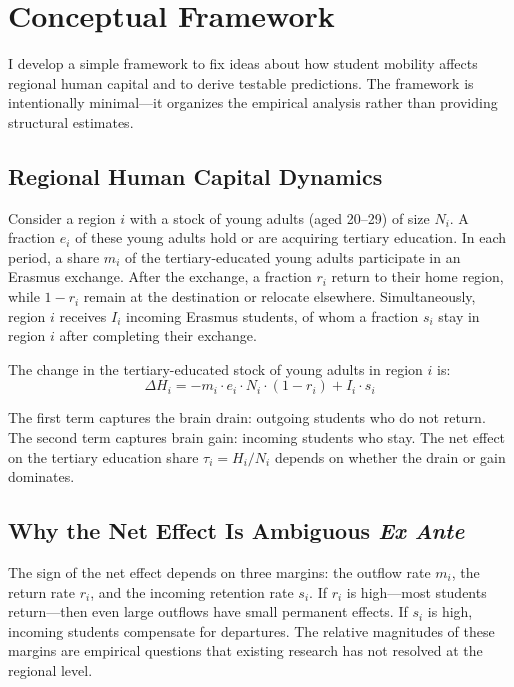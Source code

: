 \documentclass[12pt]{article}
\begin{document}
\section{Conceptual Framework}
\label{sec:framework}

I develop a simple framework to fix ideas about how student mobility affects regional human capital and to derive testable predictions. The framework is intentionally minimal---it organizes the empirical analysis rather than providing structural estimates.

\subsection{Regional Human Capital Dynamics}

Consider a region $i$ with a stock of young adults (aged 20--29) of size $N_i$. A fraction $e_i$ of these young adults hold or are acquiring tertiary education. In each period, a share $m_i$ of the tertiary-educated young adults participate in an Erasmus exchange. After the exchange, a fraction $r_i$ return to their home region, while $1 - r_i$ remain at the destination or relocate elsewhere. Simultaneously, region $i$ receives $I_i$ incoming Erasmus students, of whom a fraction $s_i$ stay in region $i$ after completing their exchange.

The change in the tertiary-educated stock of young adults in region $i$ is:
\begin{equation}
\Delta H_i = -m_i \cdot e_i \cdot N_i \cdot (1 - r_i) + I_i \cdot s_i
\label{eq:hcstock}
\end{equation}

The first term captures the brain drain: outgoing students who do not return. The second term captures brain gain: incoming students who stay. The net effect on the tertiary education share $\tau_i = H_i / N_i$ depends on whether the drain or gain dominates.

\subsection{Why the Net Effect Is Ambiguous \textit{Ex Ante}}

The sign of the net effect depends on three margins: the outflow rate $m_i$, the return rate $r_i$, and the incoming retention rate $s_i$. If $r_i$ is high---most students return---then even large outflows have small permanent effects. If $s_i$ is high, incoming students compensate for departures. The relative magnitudes of these margins are empirical questions that existing research has not resolved at the regional level.
\end{document}
